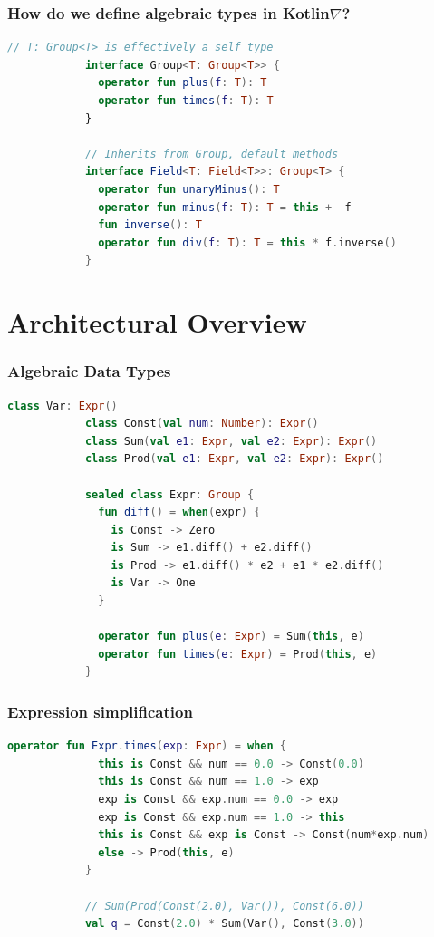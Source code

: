 \documentclass{beamer}
\begin{document}
    \begin{frame}[fragile]
        \frametitle{How do we define algebraic types in Kotlin\texorpdfstring{$\nabla$}{}?}
        \begin{lstlisting}[language=Kotlin, gobble=12]
            // T: Group<T> is effectively a self type
            interface Group<T: Group<T>> {
              operator fun plus(f: T): T
              operator fun times(f: T): T
            }

            // Inherits from Group, default methods
            interface Field<T: Field<T>>: Group<T> {
              operator fun unaryMinus(): T
              operator fun minus(f: T): T = this + -f
              fun inverse(): T
              operator fun div(f: T): T = this * f.inverse()
            }
        \end{lstlisting}
    \end{frame}


    \section{Architectural Overview}\label{sec:third-section}

    \begin{frame}[fragile]
        \frametitle{Algebraic Data Types}
        \begin{lstlisting}[language=Kotlin, gobble=12]
            class Var: Expr()
            class Const(val num: Number): Expr()
            class Sum(val e1: Expr, val e2: Expr): Expr()
            class Prod(val e1: Expr, val e2: Expr): Expr()

            sealed class Expr: Group {
              fun diff() = when(expr) {
                is Const -> Zero
                is Sum -> e1.diff() + e2.diff()
                is Prod -> e1.diff() * e2 + e1 * e2.diff()
                is Var -> One
              }

              operator fun plus(e: Expr) = Sum(this, e)
              operator fun times(e: Expr) = Prod(this, e)
            }
        \end{lstlisting}
    \end{frame}

    \begin{frame}[fragile]
        \frametitle{Expression simplification}
        \begin{lstlisting}[language=Kotlin, gobble=12]
            operator fun Expr.times(exp: Expr) = when {
              this is Const && num == 0.0 -> Const(0.0)
              this is Const && num == 1.0 -> exp
              exp is Const && exp.num == 0.0 -> exp
              exp is Const && exp.num == 1.0 -> this
              this is Const && exp is Const -> Const(num*exp.num)
              else -> Prod(this, e)
            }

            // Sum(Prod(Const(2.0), Var()), Const(6.0))
            val q = Const(2.0) * Sum(Var(), Const(3.0))
        \end{lstlisting}
    \end{frame}
\end{document}
